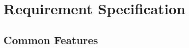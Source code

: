 \documentclass[conference]{IEEEtran}
\begin{document}
\vspace{1em} %

\newpage

\section{Requirement Specification}

\vspace{1em} %

\subsection{Common Features}
\vspace{0.5em}
\end{document}
